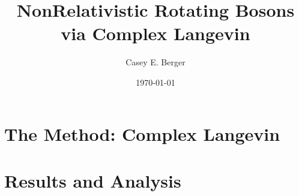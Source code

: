 \documentclass[onecolumn, 12pt]{report}
\title{NonRelativistic Rotating Bosons via Complex Langevin}
\author{Casey E. Berger}
\date{\today}
\begin{document}
\begin{titlepage}
\maketitle
\end{titlepage}
\tableofcontents

%

%


\chapter{The Method: Complex Langevin}


\chapter{Results and Analysis}


%

\end{document}
